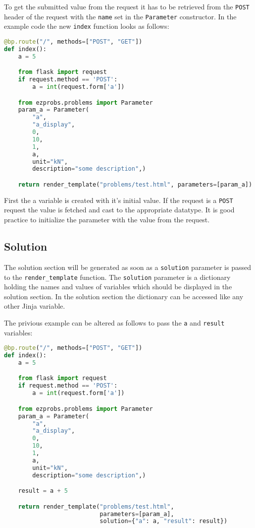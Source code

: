 To get the submitted value from the request it has to be retrieved from the
\verb+POST+ header of the request with the \verb+name+ set in the
\verb+Parameter+ constructor. In the example code the new \verb+index+ function
looks as follows:

\begin{lstlisting}[language=python]
@bp.route("/", methods=["POST", "GET"])
def index():
    a = 5

    from flask import request
    if request.method == 'POST':
        a = int(request.form['a'])

    from ezprobs.problems import Parameter
    param_a = Parameter(
        "a",
        "a_display",
        0,
        10,
        1,
        a,
        unit="kN",
        description="some description",)

    return render_template("problems/test.html", parameters=[param_a])
\end{lstlisting}

First the a variable is created with it's initial value. If the request is a
\verb+POST+ request the value is fetched and cast to the appropriate datatype.
It is good practice to initialize the parameter with the value from the
request.

\subsection{Solution}

The solution section will be generated as soon as a \verb+solution+ parameter
is passed to the \verb+render_template+ function. The \verb+solution+ parameter
is a dictionary holding the names and values of variables which should be
displayed in the solution section. In the solution section the dictionary can
be accessed like any other Jinja variable.

The privious example can be altered as follows to pass the \verb+a+ and
\verb+result+ variables:

\begin{lstlisting}[language=python]
@bp.route("/", methods=["POST", "GET"])
def index():
    a = 5

    from flask import request
    if request.method == 'POST':
        a = int(request.form['a'])

    from ezprobs.problems import Parameter
    param_a = Parameter(
        "a",
        "a_display",
        0,
        10,
        1,
        a,
        unit="kN",
        description="some description",)

    result = a + 5

    return render_template("problems/test.html",
                           parameters=[param_a],
                           solution={"a": a, "result": result})
\end{lstlisting}

